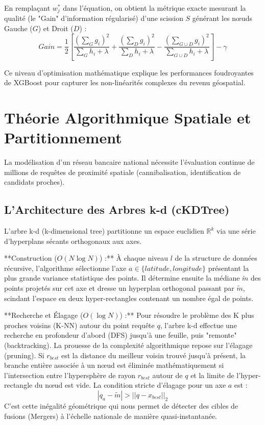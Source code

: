 \documentclass[11pt,a4paper,twoside]{report}
\begin{document}
En remplaçant $w_j^*$ dans l'équation, on obtient la métrique exacte mesurant la qualité (le "Gain" d'information régularisé) d'une scission $S$ générant les nœuds Gauche ($G$) et Droit ($D$) :
\begin{equation}
Gain = \frac{1}{2} \left[ \frac{(\sum_{G} g_i)^2}{\sum_{G} h_i + \lambda} + \frac{(\sum_{D} g_i)^2}{\sum_{D} h_i + \lambda} - \frac{(\sum_{G \cup D} g_i)^2}{\sum_{G \cup D} h_i + \lambda} \right] - \gamma
\end{equation}

Ce niveau d'optimisation mathématique explique les performances foudroyantes de XGBoost pour capturer les non-linéarités complexes du revenu géospatial.

\section{Théorie Algorithmique Spatiale et Partitionnement}

La modélisation d'un réseau bancaire national nécessite l'évaluation continue de millions de requêtes de proximité spatiale (cannibalisation, identification de candidats proches).

\subsection{L'Architecture des Arbres k-d (cKDTree)}

L'arbre k-d (k-dimensional tree) partitionne un espace euclidien $\mathbb{R}^k$ via une série d'hyperplans sécants orthogonaux aux axes. 

**Construction ($O(N \log N)$) :** À chaque niveau $l$ de la structure de données récursive, l'algorithme sélectionne l'axe $a \in \{latitude, longitude\}$ présentant la plus grande variance statistique des points. Il détermine ensuite la médiane $\tilde{m}$ des points projetés sur cet axe et dresse un hyperplan orthogonal passant par $\tilde{m}$, scindant l'espace en deux hyper-rectangles contenant un nombre égal de points.

**Recherche et Élagage ($O(\log N)$) :** Pour résoudre le problème des K plus proches voisins (K-NN) autour du point requête $q$, l'arbre k-d effectue une recherche en profondeur d'abord (DFS) jusqu'à une feuille, puis "remonte" (backtracking). La prouesse de la complexité algorithmique repose sur l'élagage (pruning).
Si $r_{best}$ est la distance du meilleur voisin trouvé jusqu'à présent, la branche entière associée à un nœud est éliminée mathématiquement si l'intersection entre l'hypersphère de rayon $r_{best}$ autour de $q$ et la limite de l'hyper-rectangle du nœud est vide. La condition stricte d'élagage pour un axe $a$ est :
\begin{equation}
|q_a - \tilde{m}| > || q - x_{best} ||_2
\end{equation}
C'est cette inégalité géométrique qui nous permet de détecter des cibles de fusions (Mergers) à l'échelle nationale de manière quasi-instantanée.
\end{document}
